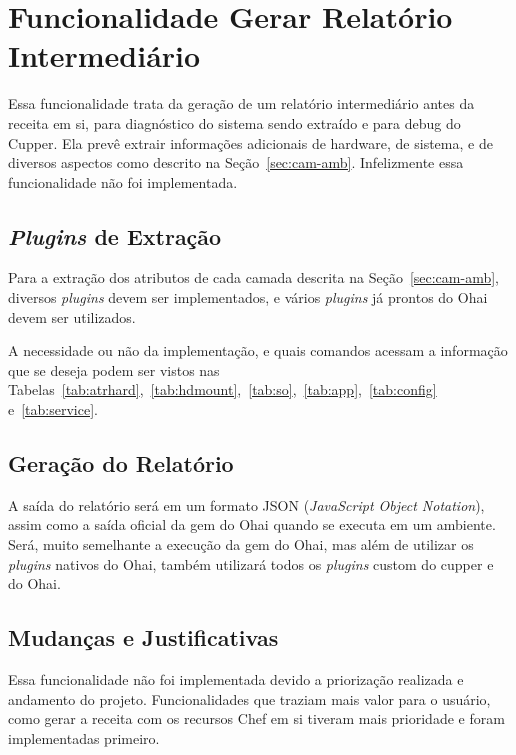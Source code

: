 \section{Funcionalidade Gerar Relatório Intermediário}
\label{sec:rel}


Essa funcionalidade trata da geração de um relatório intermediário antes da 
receita em si, para diagnóstico do sistema sendo extraído e para debug do 
Cupper. Ela prevê extrair informações adicionais de hardware, de sistema, e de
diversos aspectos como descrito na Seção~\ref{sec:cam-amb}. Infelizmente essa
funcionalidade não foi implementada.

\subsection{\textit{Plugins} de Extração}
Para a extração dos atributos de cada camada descrita na Seção~\ref{sec:cam-amb},
diversos \textit{plugins} devem ser implementados, e vários \textit{plugins} já prontos do Ohai
devem ser utilizados.

A necessidade ou não da implementação, e quais comandos acessam a informação 
que se deseja podem ser vistos nas Tabelas~\ref{tab:atrhard},~\ref{tab:hdmount},~\ref{tab:so},~\ref{tab:app},~\ref{tab:config} e~\ref{tab:service}.

\subsection{Geração do Relatório}
A saída do relatório será em um formato JSON (\textit{JavaScript Object Notation}),
assim como a saída oficial da gem do Ohai quando se executa em um ambiente. Será,
muito semelhante a execução da gem do Ohai, mas além de utilizar os \textit{plugins} nativos
do Ohai, também utilizará todos os \textit{plugins} custom do cupper e do Ohai.

\subsection{Mudanças e Justificativas}
Essa funcionalidade não foi implementada devido a priorização realizada e andamento
do projeto. Funcionalidades que traziam mais valor para o usuário, como 
gerar a receita com os recursos Chef em si tiveram mais prioridade e foram implementadas
primeiro.
